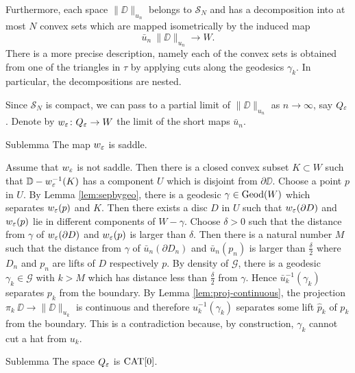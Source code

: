 \documentclass{article}
\begin{document}
Furthermore, each space $\|\DD\|_{u_n}$
belongs to $\mathcal{S}_N$ and has a decomposition into at most $N$ convex sets which are mapped isometrically by 
the induced map 
\[\bar u_n\:\|\DD\|_{u_n}\to W.\] 
There is a more precise description, namely each of the convex sets is 
obtained from one of the triangles in $\tau$ by applying cuts along the geodesics $\gamma_k$. 
In particular, the decompositions
are nested.

Since $\mathcal{S}_N$ is compact, we can pass to a partial limit of $\|\DD\|_{u_n}$ as $n\to\infty$,
say $Q_\varepsilon$.
Denote by $w_\varepsilon\colon Q_\varepsilon\to W$ the limit of the short maps $\bar u_n$.

\begin{thm}{Sublemma}
 The map $w_\varepsilon$ is saddle.
\end{thm}

Assume that $w_\varepsilon$ is not saddle. Then there is a closed convex subset $K\subset W$ such that $\mathbb{D}-w_\varepsilon^{-1}(K)$
has a component $U$ which is disjoint from $\partial \DD$. Choose a point $p$ in $U$. By Lemma \ref{lem:sepbygeo}, there is  
a geodesic $\gamma\in\mathop{\rm Geod}\nolimits(W)$ which separates $w_\varepsilon(p)$ and $K$.
Then there exists a disc $D$ in $U$ such that
$w_\varepsilon(\partial D)$ and $w_\varepsilon(p)$ lie in different components of $W-\gamma$. 
Choose $\delta>0$ 
such that the distance from $\gamma$ of $w_\varepsilon(\partial D)$ and $w_\varepsilon(p)$ is larger than $\delta$.
Then there is a natural number $M$ such that the distance from $\gamma$ of $\bar u_n(\partial D_n)$ and $\bar u_n(p_n)$ is larger than $\frac{\delta}{2}$
where $D_n$ and $p_n$ are lifts of $D$ respectively $p$.
By density of $\mathcal{G}$, there is a geodesic $\gamma_k\in \mathcal{G}$ with $k>M$ which has distance less than $\frac{\delta}{2}$ from $\gamma$. 
Hence $\bar u_k^{-1}(\gamma_k)$ separates $p_k$ from the boundary. 
By Lemma \ref{lem:proj-continuous}, the projection $\pi_k\:\DD\to \|\DD\|_{u_k}$ is continuous
and therefore $u_k^{-1}(\gamma_k)$ separates some lift $\hat p_k$ of $p_k$ from the boundary.
This is a contradiction because, by construction, $\gamma_k$ cannot cut a hat from $u_k$.
\qeds

\begin{thm}{Sublemma}
The space $Q_\varepsilon$ is $\mathop{\rm CAT}\nolimits[0]$. 
\end{thm}
\end{document}
